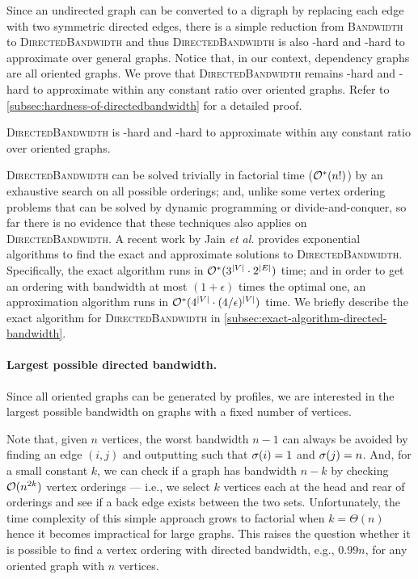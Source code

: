 Since an undirected graph can be converted to a digraph by replacing each edge with two symmetric directed edges, there is a simple reduction from \textsc{Bandwidth} to \textsc{DirectedBandwidth} and thus \textsc{DirectedBandwidth} is also \NP-hard and \NP-hard to approximate over general graphs.
%
Notice that, in our context, dependency graphs are all oriented graphs.
%
We prove that \textsc{DirectedBandwidth} remains \NP-hard and \NP-hard to approximate within any constant ratio over oriented graphs.
%
Refer to \cref{subsec:hardness-of-directedbandwidth} for a detailed proof.

\begin{theorem}
    \textsc{DirectedBandwidth} is \NP-hard and \NP-hard to approximate within any constant ratio over oriented graphs.
\end{theorem}

\textsc{DirectedBandwidth} can be solved trivially in factorial time ($\mathcal{O}^\ast(n!)$) by an exhaustive search on all possible orderings; and, unlike some vertex ordering problems that can be solved by dynamic programming or divide-and-conquer, so far there is no evidence that these techniques also applies on \textsc{DirectedBandwidth}.
%
A recent work by Jain \textit{et al.} \cite{FSTTCS:JKLSS19} provides exponential algorithms to find the exact and approximate solutions to \textsc{DirectedBandwidth}.
%
Specifically, the exact algorithm runs in $\mathcal{O}^\ast(3^{|V|} \cdot 2^{|E|})$ time; and in order to get an ordering with bandwidth at most $(1 + \epsilon)$ times the optimal one, an approximation algorithm runs in $\mathcal{O}^\ast(4^{|V|} \cdot (4 / \epsilon)^{|V|})$ time.
%
We briefly describe the exact algorithm for \textsc{DirectedBandwidth} in \cref{subsec:exact-algorithm-directed-bandwidth}.

\paragraph{Largest possible directed bandwidth.}
%
Since all oriented graphs can be generated by profiles, we are interested in the largest possible bandwidth on graphs with a fixed number of vertices.

Note that, given $n$ vertices, the worst bandwidth $n - 1$ can always be avoided by finding an edge $(i, j)$ and outputting \orderOutput such that $\sigma(i) = 1$ and $\sigma(j) = n$.
%
And, for a small constant $k$, we can check if a graph has bandwidth $n - k$ by checking $\mathcal{O}(n^{2k})$ vertex orderings --- i.e., we select $k$ vertices each at the head and rear of orderings and see if a back edge exists between the two sets.
%
Unfortunately, the time complexity of this simple approach grows to factorial when $k = \Theta(n)$ hence it becomes impractical for large graphs.
%
This raises the question whether it is possible to find a vertex ordering with directed bandwidth, e.g., $0.99 n$, for any oriented graph with $n$ vertices.

